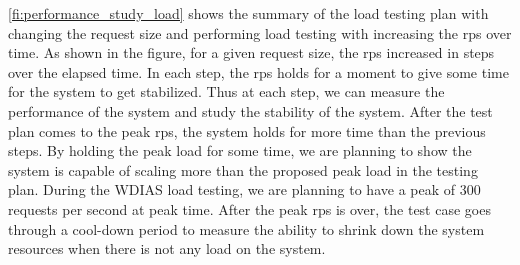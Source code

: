 \cref{fi:performance_study_load} shows the summary of the load testing plan with changing the request size and performing load testing with increasing the \acrshort{rps} over time. As shown in the figure, for a given request size, the \acrshort{rps} increased in steps over the elapsed time. In each step, the \acrshort{rps} holds for a moment to give some time for the system to get stabilized. Thus at each step, we can measure the performance of the system and study the stability of the system. After the test plan comes to the peak \acrshort{rps}, the system holds for more time than the previous steps. By holding the peak load for some time, we are planning to show the system is capable of scaling more than the proposed peak load in the testing plan. During the WDIAS load testing, we are planning to have a peak of 300 requests per second at peak time. After the peak \acrshort{rps} is over, the test case goes through a cool-down period to measure the ability to shrink down the system resources when there is not any load on the system.

